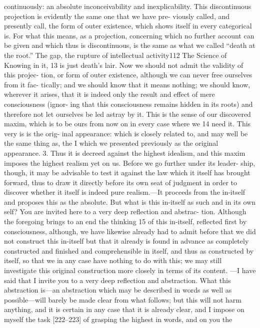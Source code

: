 continuously: an absolute inconceivability and inexplicability.
This discontinuous projection is evidently the same one that we have pre-
viously called, and presently call, the form of outer existence, which shows itself
in every categorical is. For what this means, as a projection, concerning which
no further account can be given and which thus is discontinuous, is the same as
what we called “death at the root.” The gap, the rupture of intellectual activity112
The Science of Knowing
in it, 13 is just death’s lair. Now we should not admit the validity of this projec-
tion, or form of outer existence, although we can never free ourselves from it fac-
tically; and we should know that it means nothing; we should know, wherever
it arises, that it is indeed only the result and effect of mere consciousness (ignor-
ing that this consciousness remains hidden in its roots) and therefore not let
ourselves be led astray by it. This is the sense of our discovered maxim, which is
to be ours from now on in every case where we 14 need it. This very is is the orig-
inal appearance: which is closely related to, and may well be the same thing as,
the I which we presented previously as the original appearance.
3. Thus it is decreed against the highest idealism, and this maxim
imposes the highest realism yet on us. Before we go further under its leader-
ship, though, it may be advisable to test it against the law which it itself has
brought forward, thus to draw it directly before its own seat of judgment in
order to discover whether it itself is indeed pure realism.—It proceeds from
the in-itself and proposes this as the absolute. But what is this in-itself as such
and in its own self? You are invited here to a very deep reflection and abstrac-
tion. Although the foregoing brings to an end the thinking 15 of this in-itself,
reflected first by consciousness, although, we have likewise already had to
admit before that we did not construct this in-itself but that it already is found
in advance as completely constructed and finished and comprehensible in
itself, and thus as constructed by itself, so that we in any case have nothing to
do with this; we may still investigate this original construction more closely in
terms of its content.
—I have said that I invite you to a very deep reflection and abstraction.
What this abstraction is—an abstraction which may be described in words as
well as possible—will barely be made clear from what follows; but this will not
harm anything, and it is certain in any case that it is already clear, and I impose
on myself the task [222–223] of grasping the highest in words, and on you the
